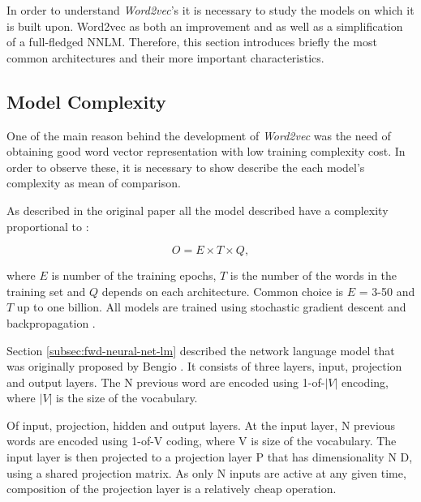 In order to understand  \textit{Word2vec}'s it is necessary to study the
models on which it is built upon. Word2vec as both an improvement and
as well as a simplification of a full-fledged \ac{NNLM}. Therefore, this section introduces
briefly the most common  architectures and their more important
characteristics.

\subsection{Model Complexity}

One of the main reason behind the development of \textit{Word2vec} was the
need of obtaining good word vector representation with low training complexity cost. In
order to observe these, it is necessary to show describe the each model's
complexity as mean of comparison.

As described in the original paper all the model described have a complexity
proportional to \cite{DBLP:journals/corr/abs-1301-3781}:

\begin{center}
\begin{equation} O = E \times T \times Q,   \end{equation}
\end{center}

where $E$ is number of the training epochs, $T$ is the number of the words in
the training set and $Q$ depends on each architecture. Common choice is $E$ = 3-50 and $T$ up to one billion.
All models are trained using stochastic gradient descent and backpropagation \cite{Bengio:2003:NPL:944919.944966}\cite{DBLP:journals/corr/abs-1301-3781}.


Section \ref{subsec:fwd-neural-net-lm} described the network language model
that was originally proposed by Bengio \cite{Bengio:2003:NPL:944919.944966}.
It consists of three layers, input, projection and output layers. The N
previous word are encoded using 1-of-$|V|$ encoding, where $|V|$ is the size
of the vocabulary. 

Of input, projection, hidden and output layers. At the input layer, N previous words are encoded
using 1-of-V coding, where V is size of the vocabulary. The input layer is then projected to a
projection layer P that has dimensionality N  D, using a shared projection matrix. As only N
inputs are active at any given time, composition of the projection layer is a relatively cheap operation.




